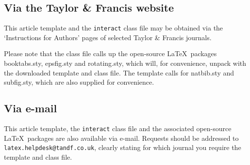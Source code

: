 \documentclass[]{interact}
\theoremstyle{plain}%
\theoremstyle{definition}
\theoremstyle{remark}
\begin{document}
\subsection{Via the Taylor \& Francis website}

This article template and the \texttt{interact} class file may be obtained via the `Instructions for Authors' pages of selected Taylor \& Francis journals.

Please note that the class file calls up the open-source \LaTeX\ packages booktabs.sty, epsfig.sty and rotating.sty, which will, for convenience, unpack with the downloaded template and class file. The template calls for natbib.sty and subfig.sty, which are also supplied for convenience.


\subsection{Via e-mail}

This article template, the \texttt{interact} class file and the associated open-source \LaTeX\ packages are also available via e-mail. Requests should be addressed to \texttt{latex.helpdesk@tandf.co.uk}, clearly stating for which journal you require the template and class file.
\end{document}
